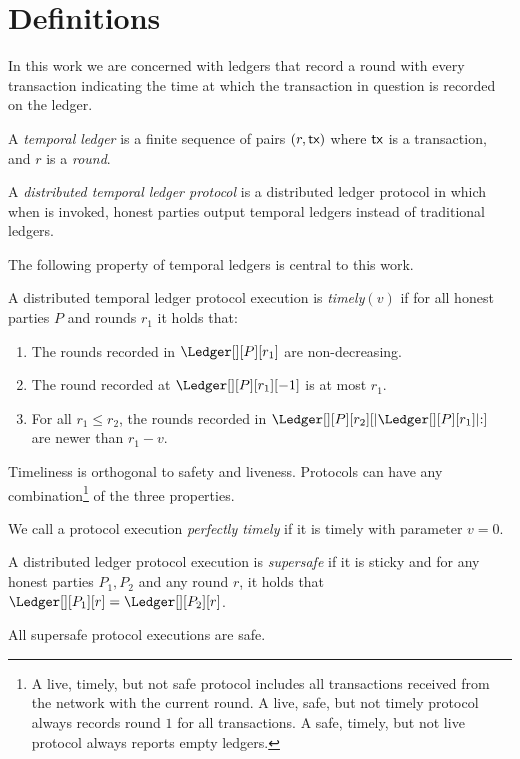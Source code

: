 \section{Definitions}\label{sec:defs}

In this work we are concerned with ledgers that
record a round with every transaction indicating the time at which
the transaction in question is recorded on the ledger.

\begin{definition}
  A \emph{temporal ledger} is a finite sequence of pairs $(r, \textsf{tx})$ where $\textsf{tx}$ is
  a transaction, and $r$ is a \emph{round}.
\end{definition}

\begin{definition}
  A \emph{distributed temporal ledger protocol} is a distributed ledger protocol
  in which when \rread is invoked, honest parties output temporal ledgers instead of traditional ledgers.
\end{definition}

The following property of temporal ledgers is central to this work.

\begin{definition}[Timely]\label{def:timely}
  A distributed temporal ledger protocol execution is \emph{timely}$(v)$
  if for all honest parties $P$ and rounds $r_1$ it holds that:

  \begin{enumerate}
    \item The rounds recorded in $\Ledger[][P][r_1]$ are non-decreasing.\label{def:timely-increasing}
    \item The round recorded at $\Ledger[][P][r_1][-1]$ is at most $r_1$.\label{def:timely-past}
    \item For all $r_1 \leq r_2$, the rounds recorded in $\Ledger[][P][r_2][|\Ledger[][P][r_1]|{:}]$ are
          newer than $r_1 - v$.\label{def:timely-chunk}
  \end{enumerate}
\end{definition}

Timeliness is orthogonal to safety and liveness. Protocols can have any
combination\footnote{A live, timely, but not safe protocol includes all transactions
received from the network with the current round.
A live, safe, but not timely protocol always records round $1$ for all transactions.
A safe, timely, but not live protocol always reports empty ledgers.}
of the three properties.

\begin{definition}
  We call a protocol execution \emph{perfectly timely} if it is timely with parameter $v = 0$.
\end{definition}

\begin{definition}[Supersafety]
  A distributed ledger protocol execution is \emph{supersafe} if it is sticky and
  for any honest parties $P_1, P_2$ and any round $r$, it holds that
  $\Ledger[][P_1][r] = \Ledger[][P_2][r]$.
\end{definition}

All supersafe protocol executions are safe.
